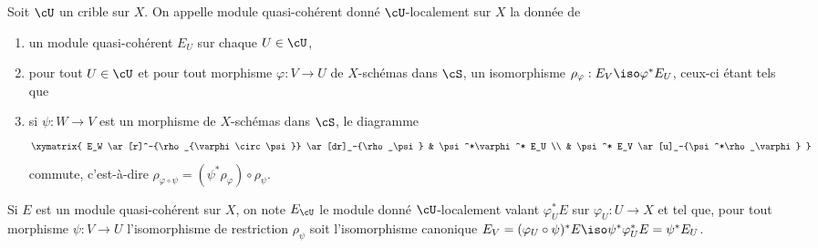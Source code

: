\subsubsection{}\label{I:1-4-4}

Soit $\cU$ un crible sur $X$. On appelle module quasi-cohérent donné 
$\cU$-localement sur $X$ la donnée de 
\begin{enumerate}[\indent a)]
  \item un module quasi-cohérent $E_U$ sur chaque $U\in\cU$, 
  \item pour tout $U\in\cU$ et pour tout morphisme $\varphi:V\to U$ de 
    $X$-schémas dans $\cS$, un isomorphisme 
    $\rho_\varphi:E_V\iso \varphi^* E_U$, ceux-ci étant tels que 
  \item si $\psi:W\to V$ est un morphisme de $X$-schémas dans $\cS$, le 
    diagramme 
    \[\xymatrix{
      E_W \ar[r]^-{\rho_{\varphi\circ\psi}} \ar[dr]_-{\rho_\psi} 
        & \psi^*\varphi^* E_U \\
      & \psi^* E_V \ar[u]_-{\psi^*\rho_\varphi}
    }\]
    commute, c'est-à-dire 
    $\rho_{\varphi\circ\psi}=(\psi^*\rho_\varphi)\circ \rho_\psi$. 
\end{enumerate}

Si $E$ est un module quasi-cohérent sur $X$, on note $E_\cU$ le module 
donné $\cU$-localement valant $\varphi_U^* E$ sur $\varphi_U:U\to X$ et tel que, 
pour tout morphisme $\psi:V\to U$ l'isomorphisme de restriction $\rho_\psi$ 
soit l'isomorphisme canonique 
$E_V=(\varphi_U\circ \psi)^* E\iso \psi^* \varphi_U^* E = \psi^* E_U$. 


